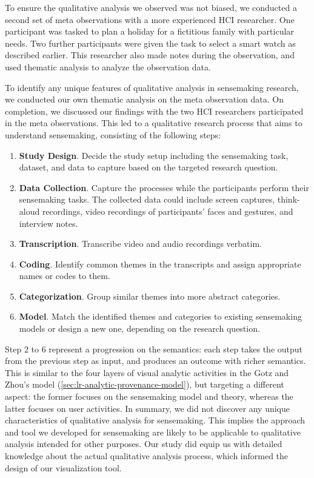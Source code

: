 To ensure the qualitative analysis we observed was not biased, we conducted a second set of meta observations with a more experienced HCI researcher. One participant was tasked to plan a holiday for a fictitious family with particular needs. Two further participants were given the task to select a smart watch as described earlier. This researcher also made notes during the observation, and used thematic analysis to analyze the observation data.

To identify any unique features of qualitative analysis in sensemaking research, we conducted our own thematic analysis on the meta observation data. On completion, we discussed our findings with the two HCI researchers participated in the meta observations. This led to a qualitative research process that aims to understand sensemaking, consisting of the following steps:

\begin{enumerate}
	\item \textbf{Study Design}. Decide the study setup including the sensemaking task, dataset, and data to capture based on the targeted research question.
	\item \textbf{Data Collection}. Capture the processes while the participants perform their sensemaking tasks. The collected data could include screen captures, think-aloud recordings, video recordings of participants' faces and gestures, and interview notes.
	\item \textbf{Transcription}. Transcribe video and audio recordings verbatim.
	\item \textbf{Coding}. Identify common themes in the transcripts and assign appropriate names or codes to them.
	\item \textbf{Categorization}. Group similar themes into more abstract categories.
	\item \textbf{Model}. Match the identified themes and categories to existing sensemaking models or design a new one, depending on the research question.
\end{enumerate}

Step 2 to 6 represent a progression on the semantics: each step takes the output from the previous step as input, and produces an outcome with richer semantics. This is similar to the four layers of visual analytic activities in the Gotz and Zhou's model (\autoref{sec:lr-analytic-provenance-model}), but targeting a different aspect: the former focuses on the sensemaking model and theory, whereas the latter focuses on user activities. In summary, we did not discover any unique characteristics of qualitative analysis for sensemaking. This implies the approach and tool we developed for sensemaking are likely to be applicable to qualitative analysis intended for other purposes. Our study did equip us with detailed knowledge about the actual qualitative analysis process, which informed the design of our visualization tool.

